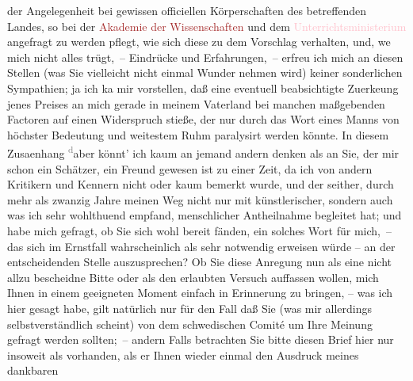                     der Angelegenheit bei gewissen officiellen Körperschaften des betreffenden
                    Landes, so bei der \textcolor{brown}{Akademie der Wissenschaften}{}\ledrightnote{\textcolor{brown}{Österreichische Akademie der Wissenschaften}}
                    und dem \textcolor{pink}{Unterrichtsministerium}{}\ledrightnote{\textcolor{pink}{Ministerium für Unterricht}} angefragt zu
                    werden pflegt, wie sich diese zu dem {\pb}Vorschlag verhalten, und, we{\geminationn} mich nicht alles
                    trügt, – Eindrücke und Erfahrungen, – erfreu ich mich an diesen Stellen (was Sie
                    vielleicht nicht einmal Wunder nehmen wird) keiner sonderlichen Sympathien; ja
                    ich ka{\geminationn} mir vorstellen, daß eine eventuell
                    beabsichtigte Zuerke{\geminationn}ung jenes Preises an mich
                    gerade in meinem Vaterland bei manchen maßgebenden Factoren auf einen
                    Widerspruch stieße, der nur durch das Wort eines Manns von höchster Bedeutung
                    und weitestem Ruhm paralysirt werden könnte. In diesem Zusa{\geminationm}enhang \substVorne{}\textsuperscript{\textcolor{gray}{d}}\substDazwischen{}a\substHinten{}ber könnt’ ich kaum an jemand andern denken als an Sie, der mir schon
                    ein Schätzer, ein {\pb}Freund gewesen ist zu
                    einer Zeit, da ich von andern Kritikern und Kennern nicht oder kaum bemerkt
                    wurde, und der seither, durch mehr als zwanzig Jahre meinen Weg nicht nur mit
                    künstlerischer, sondern \introOben{}auch\introOben{} was ich sehr wohlthuend
                    empfand, menschlicher Antheilnahme begleitet hat; und habe mich gefragt, ob Sie
                    sich wohl bereit fänden, ein solches Wort für mich, – das sich im Ernstfall
                    wahrscheinlich als sehr notwendig erweisen würde – an der entscheidenden Stelle
                    auszusprechen? Ob Sie \introOben{}\introOben{} diese Anregung nun als eine nicht allzu bescheidne Bitte oder als den
                    erlaubten Versuch auffassen wollen, mich Ihnen in einem geeigneten Moment
                    einfach in Erinnerung zu bringen, {\pb}– was ich
                    hier gesagt habe, gilt natürlich nur für den Fall daß Sie (was mir allerdings
                    selbstverständlich scheint) von dem schwedischen Comité um Ihre Meinung gefragt
                    werden sollten; – andern Falls betrachten Sie bitte diesen Brief hier nur
                    insoweit als vorhanden, als er Ihnen wieder einmal den Ausdruck meines dankbaren

